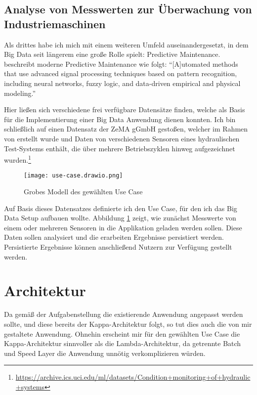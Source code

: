 \subsection{Analyse von Messwerten zur Überwachung von Industriemaschinen}

Als drittes habe ich mich mit einem weiteren Umfeld auseinandergesetzt, in dem Big Data seit längerem eine große Rolle spielt: Predictive Maintenance.
\citeauthor{hashemian_state---art_2011} beschreibt moderne Predictive Maintenance wie folgt: \enquote{[A]utomated methods that use advanced signal processing techniques based on pattern recognition, including neural networks, fuzzy logic, and data-driven empirical and physical modeling.} \parencite{hashemian_state---art_2011}

Hier ließen sich verschiedene frei verfügbare Datensätze finden, welche als Basis für die Implementierung einer Big Data Anwendung dienen konnten.
Ich bin schließlich auf einen Datensatz der ZeMA gGmbH gestoßen, welcher im Rahmen von \cite{helwig_condition_2015} erstellt wurde und Daten von verschiedenen Sensoren eines hydraulischen Test-Systems enthält, die über mehrere Betriebszyklen hinweg aufgezeichnet wurden.\footnote{\url{https://archive.ics.uci.edu/ml/datasets/Condition+monitoring+of+hydraulic+systems}}

\begin{figure}[H]
  \centering
  \texttt{[image: use-case.drawio.png]}
  \caption{Grobes Modell des gewählten Use Case}\label{fig:use-case}
\end{figure}

Auf Basis dieses Datensatzes definierte ich den Use Case, für den ich das Big Data Setup aufbauen wollte.
Abbildung \ref{fig:use-case} zeigt, wie zunächst Messwerte von einem oder mehreren Sensoren in die Applikation geladen werden sollen.
Diese Daten sollen analysiert und die erarbeiten Ergebnisse persistiert werden.
Persistierte Ergebnisse können anschließend Nutzern zur Verfügung gestellt werden.

\section{Architektur}\label{sec:architektur}

Da gemäß der Aufgabenstellung die existierende Anwendung angepasst werden sollte, und diese bereits der Kappa-Architektur folgt, so tut dies auch die von mir gestaltete Anwendung.
Ohnehin erscheint mir für den gewählten Use Case die Kappa-Architektur sinnvoller als die Lambda-Architektur, da getrennte Batch und Speed Layer die Anwendung unnötig verkomplizieren würden.

